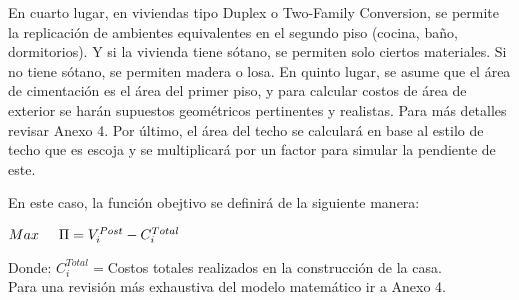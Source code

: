 En cuarto lugar, en viviendas tipo Duplex o Two-Family Conversion, se permite la replicación de ambientes equivalentes en el segundo piso (cocina, baño, dormitorios). Y si la vivienda tiene sótano, se permiten solo ciertos materiales. Si no tiene sótano, se permiten madera o losa. En quinto lugar, se asume que el área de cimentación es el área del primer piso, y para calcular costos de área de exterior se harán supuestos geométricos pertinentes y realistas. Para más detalles revisar Anexo 4. Por último, el área del techo se calculará en base al estilo de techo que es escoja y se multiplicará por un factor para simular la pendiente de este.

En este caso, la función obejtivo se definirá de la siguiente manera:
\begin{center}
    $Max\hspace{5mm}\Pi=V_{i}^{Post}-C_{i}^{Total}$
\end{center}
Donde:
 $C_i^{Total}=$Costos totales realizados en la construcción de la casa.
\\
Para una revisión más exhaustiva del modelo matemático ir a Anexo 4.